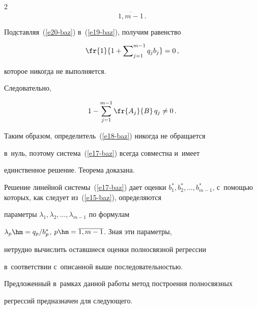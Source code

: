 \begin{multicols}{2}
\begin{equation}
\overline{1,m-1}\,.


    \label{e20-baz}


    \end{equation}




    Подставляя~(\ref{e20-baz}) в~(\ref{e19-baz}), получим равенство 


    $$


    \fr{1}{1+ \sum\nolimits_{j=1}^{m-1} q_j b_j}=0\,,


    $$


     которое никогда не выполняется. 


Следовательно, 


$$


1- \sum\limits_{j=1}^{m-1}\fr{A_j}{B}\,q_j \not= 0\,.


$$


    


    Таким образом, определитель~(\ref{e18-baz}) никогда не обращается 


в~нуль, поэтому система~(\ref{e17-baz}) всегда совместна и~имеет 


единственное решение. Теорема доказана.


    


    \smallskip


    


    Решение линейной системы~(\ref{e17-baz}) дает оценки $b_1^*, b_2^*, 


\ldots ,  


b^*_{m-1}$, с~помощью которых, как следует из~(\ref{e15-baz}), определяются 


параметры $\lambda_1, \lambda_2, \ldots , \lambda_{m-1}$ по формулам 


$\lambda_p\hm= q_p/b_p^*$, $p\hm= \overline{1,m-1}$. Зная эти параметры, 


нетрудно вычислить оставшиеся оценки полносвязной регрессии 


в~соответствии с~описанной выше последовательностью.


    


    Предложенный в~рамках данной работы метод построения полносвязных 


регрессий предназначен для следующего.


    \begin{enumerate}[1.]



\end{enumerate}
\end{multicols}
